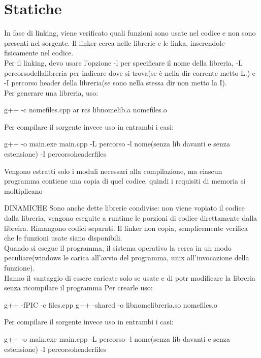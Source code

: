 \section{Statiche}
In fase di linking, viene verificato quali funzioni sono usate nel codice e non sono presenti nel sorgente. Il linker cerca nelle librerie e le linka, inserendole fisicamente nel codice.\\
Per il linking, devo usare l'opzione -l per specificare il nome della libreria, -L percorsodellalibreria per indicare dove si trova(se è nella dir corrente metto L.) e -I percorso header della libreria(se sono nella stessa dir non metto la I).\\
Per generare una libreria, uso:

\begin{tcolorbox}
g++ -c nomefiles.cpp 
ar rcs libnomelib.a nomefiles.o
\end{tcolorbox}

Per compilare il sorgente invece uso in entrambi i casi:
\begin{tcolorbox}
g++ -o main.exe main.cpp -L percorso -l nome(senza lib davanti e senza estensione) -I percorsoheaderfiles
\end{tcolorbox}

Vengono estratti solo i moduli necessari alla compilazione, ma ciascun programma contiene una copia di quel codice, quindi i requisiti di memoria si moltiplicano

DINAMICHE
Sono anche dette librerie condivise: non viene vopiato il codice dalla libreria, vengono eseguite a runtime le porzioni di codice direttamente dalla libreira. Rimangono codici separati. Il linker non copia, semplicemente verifica che le funzioni usate siano disponibili.\\
Quando si esegue il programma, il sistema operativo la cerca in un modo peculiare(windows le carica all'avvio del programma, unix all'invocazione della funzione).\\
Hanno il vantaggio di essere caricate solo se usate e di potr modificare la libreria senza ricompilare il programma
Per crearle uso:

\begin{cpp}
g++ -fPIC -c files.cpp
g++ -shared -o libnomelibreria.so nomefiles.o
\end{cpp}

Per compilare il sorgente invece uso in entrambi i casi:
\begin{tcolorbox}
g++ -o main.exe main.cpp -L percorso -l nome(senza lib davanti e senza estensione) -I percorsoheaderfiles
\end{tcolorbox}


